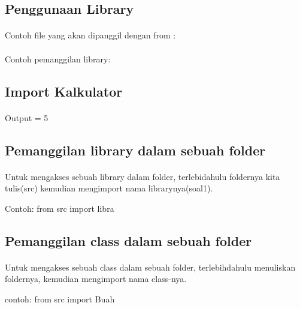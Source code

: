 \documentclass{article}
\begin{document}
    \subsection{Penggunaan Library}
        \paragraph{}Contoh file yang akan dipanggil dengan from :
            
        \paragraph{}Contoh pemanggilan library:
            
            
    \subsection{Import Kalkulator}
        
        
        \paragraph{}Output = 5
    
    \subsection{Pemanggilan library dalam sebuah folder}
        \paragraph{}Untuk mengakses sebuah library dalam folder, terlebidahulu foldernya kita tulis(src) kemudian mengimport nama librarynya(soal1).
        
        Contoh: from src import libra
    
    \subsection{Pemanggilan class dalam sebuah folder}
        \paragraph{}Untuk mengakses sebuah class dalam sebuah folder, terlebihdahulu menuliskan foldernya, kemudian mengimport nama class-nya.
        
        contoh: from src import Buah
    
\end{document}
